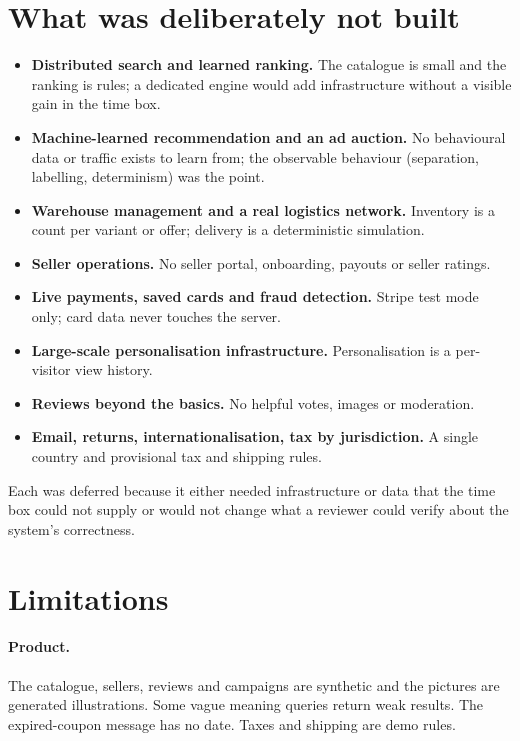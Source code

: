 \section{What was deliberately not built}

\begin{itemize}
\item \textbf{Distributed search and learned ranking.} The catalogue is small and the ranking is rules; a dedicated engine would add infrastructure without a visible gain in the time box.
\item \textbf{Machine-learned recommendation and an ad auction.} No behavioural data or traffic exists to learn from; the observable behaviour (separation, labelling, determinism) was the point.
\item \textbf{Warehouse management and a real logistics network.} Inventory is a count per variant or offer; delivery is a deterministic simulation.
\item \textbf{Seller operations.} No seller portal, onboarding, payouts or seller ratings.
\item \textbf{Live payments, saved cards and fraud detection.} Stripe test mode only; card data never touches the server.
\item \textbf{Large-scale personalisation infrastructure.} Personalisation is a per-visitor view history.
\item \textbf{Reviews beyond the basics.} No helpful votes, images or moderation.
\item \textbf{Email, returns, internationalisation, tax by jurisdiction.} A single country and provisional tax and shipping rules.
\end{itemize}

Each was deferred because it either needed infrastructure or data that the time box could not supply or would not change what a reviewer could verify about the system's correctness.

\section{Limitations}

\paragraph{Product.} The catalogue, sellers, reviews and campaigns are synthetic and the pictures are generated illustrations. Some vague meaning queries return weak results. The expired-coupon message has no date. Taxes and shipping are demo rules.

